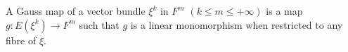A Gauss map of a vector bundle $\xi^k$ in $F^m$ $(k \leq m \leq +\infty)$ is a map $g: E(\xi^k) \rightarrow F^m$ such that $g$ is a linear monomorphism when restricted to any fibre of $\xi$.
